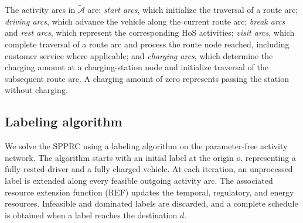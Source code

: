 \documentclass[3p,11pt,authoryear]{elsarticle}  %
\begin{document}
The activity arcs in \(\mathcal{\widetilde{A}}\) are: \emph{start arcs}, which initialize the traversal of a route arc; \emph{driving arcs}, which advance the vehicle along the current route arc; \emph{break arcs} and \emph{rest arcs}, which represent the corresponding HoS activities; \emph{visit arcs}, which complete traversal of a route arc and process the route node reached, including customer service where applicable; and \emph{charging arcs}, which determine the charging amount at a charging-station node and initialize traversal of the subsequent route arc. A charging amount of zero represents passing the station without charging. %






\subsection{Labeling algorithm}

We solve the SPPRC using a labeling algorithm on the parameter-free
activity network. The algorithm starts with an initial label at the origin
$o$, representing a fully rested driver and a fully charged vehicle. At
each iteration, an unprocessed label is extended along every feasible
outgoing activity arc. The associated resource extension function (REF) updates the temporal, regulatory, and energy resources. Infeasible and dominated labels are discarded, and a complete schedule is obtained when a label reaches the destination $d$.
\end{document}
